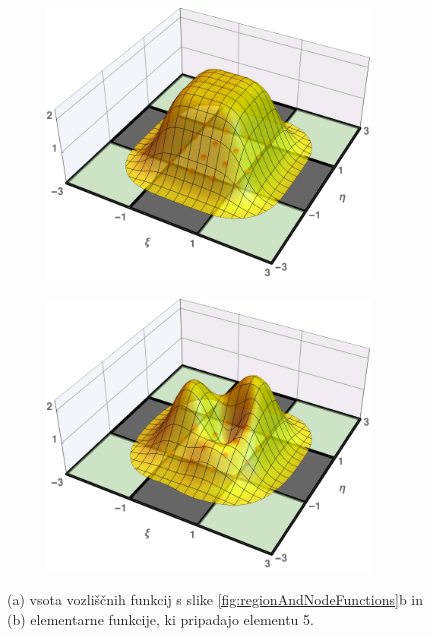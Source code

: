 \begin{figure}[ht]
   \centering
    \begin{subfigure}[b]{0.48\textwidth}
        \centering
        \includegraphics[width=0.94\textwidth]{Slike/nodalFuncsSumOverElm}
        \vspace{0mm}
        \caption{}
    \end{subfigure}
    \begin{subfigure}[b]{0.48\textwidth}
        \centering
        \includegraphics[width=0.94\textwidth]{Slike/nodalFuncsSumOverElmMod}
        \caption{}
    \end{subfigure}
    \caption{(a) vsota vozliščnih funkcij s slike \ref{fig:regionAndNodeFunctions}b in (b) elementarne funkcije, ki pripadajo elementu 5.}
    \label{fig:sumAndShapeFunctions}
\end{figure}

